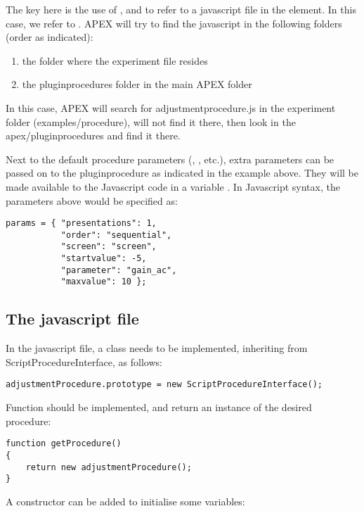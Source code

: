 The key here is the use of , and to refer to a javascript file in the  element. In this case, we refer to . APEX will try to find the javascript in the following folders (order as indicated):
\begin{enumerate}
\item the folder where the experiment file resides
\item the pluginprocedures folder in the main APEX folder
\end{enumerate}

In this case, APEX will search for adjustmentprocedure.js in the experiment folder (examples/procedure), will not find it there, then look in the apex/pluginprocedures and find it there.

Next to the default procedure parameters (, , etc.), extra parameters can be passed on to the pluginprocedure as indicated in the example above. They will be made available to the Javascript code in a variable . In Javascript syntax, the parameters above would be specified as:

\begin{lstlisting}
params = { "presentations": 1,
		   "order": "sequential",
		   "screen": "screen",
		   "startvalue": -5,
		   "parameter": "gain_ac",
		   "maxvalue": 10 };
\end{lstlisting}



\subsection{The javascript file}

In the javascript file, a class needs to be implemented, inheriting from ScriptProcedureInterface, as follows:

\begin{lstlisting}
adjustmentProcedure.prototype = new ScriptProcedureInterface();
\end{lstlisting}

Function  should be implemented, and return an instance of the desired procedure:

\begin{lstlisting}
function getProcedure()
{
    return new adjustmentProcedure();
}
\end{lstlisting}

A constructor can be added to initialise some variables:

